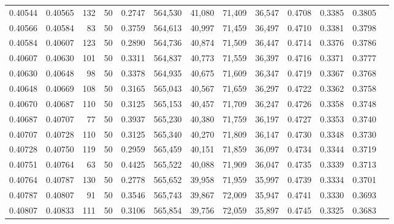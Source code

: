 \begin{tabular}{rrrrrrrrrrrrr}
0.40544 & 0.40565 &   132 &  50 &                                     0.2747 & 564,530 &  41,080 &  71,409 &  36,547 & 0.4708 & 0.3385 & 0.3805 \\
0.40566 & 0.40584 &    83 &  50 &                                     0.3759 & 564,613 &  40,997 &  71,459 &  36,497 & 0.4710 & 0.3381 & 0.3798 \\
0.40584 & 0.40607 &   123 &  50 &                                     0.2890 & 564,736 &  40,874 &  71,509 &  36,447 & 0.4714 & 0.3376 & 0.3786 \\
0.40607 & 0.40630 &   101 &  50 &                                     0.3311 & 564,837 &  40,773 &  71,559 &  36,397 & 0.4716 & 0.3371 & 0.3777 \\
0.40630 & 0.40648 &    98 &  50 &                                     0.3378 & 564,935 &  40,675 &  71,609 &  36,347 & 0.4719 & 0.3367 & 0.3768 \\
0.40648 & 0.40669 &   108 &  50 &                                     0.3165 & 565,043 &  40,567 &  71,659 &  36,297 & 0.4722 & 0.3362 & 0.3758 \\
0.40670 & 0.40687 &   110 &  50 &                                     0.3125 & 565,153 &  40,457 &  71,709 &  36,247 & 0.4726 & 0.3358 & 0.3748 \\
0.40687 & 0.40707 &    77 &  50 &                                     0.3937 & 565,230 &  40,380 &  71,759 &  36,197 & 0.4727 & 0.3353 & 0.3740 \\
0.40707 & 0.40728 &   110 &  50 &                                     0.3125 & 565,340 &  40,270 &  71,809 &  36,147 & 0.4730 & 0.3348 & 0.3730 \\
0.40728 & 0.40750 &   119 &  50 &                                     0.2959 & 565,459 &  40,151 &  71,859 &  36,097 & 0.4734 & 0.3344 & 0.3719 \\
0.40751 & 0.40764 &    63 &  50 &                                     0.4425 & 565,522 &  40,088 &  71,909 &  36,047 & 0.4735 & 0.3339 & 0.3713 \\
0.40764 & 0.40787 &   130 &  50 &                                     0.2778 & 565,652 &  39,958 &  71,959 &  35,997 & 0.4739 & 0.3334 & 0.3701 \\
0.40787 & 0.40807 &    91 &  50 &                                     0.3546 & 565,743 &  39,867 &  72,009 &  35,947 & 0.4741 & 0.3330 & 0.3693 \\
0.40807 & 0.40833 &   111 &  50 &                                     0.3106 & 565,854 &  39,756 &  72,059 &  35,897 & 0.4745 & 0.3325 & 0.3683 \\

\end{tabular}
